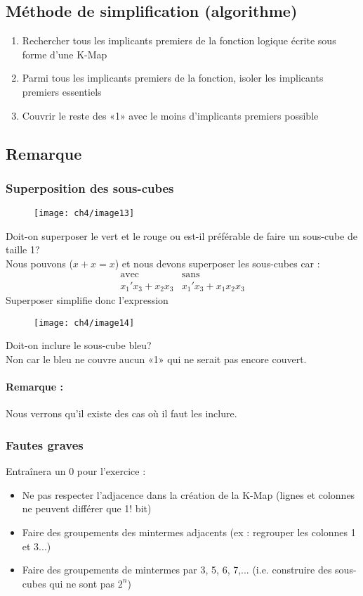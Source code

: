 \subsection{Méthode de simplification (algorithme)}
\begin{enumerate}
	\item Rechercher tous les implicants premiers de la fonction logique écrite sous forme d'une K-Map
	\item Parmi tous les implicants premiers de la fonction, isoler les implicants premiers essentiels 
	\item Couvrir le reste des «1» avec le moins d'implicants premiers possible
\end{enumerate}
\subsection{Remarque}
\subsubsection{Superposition des sous-cubes}
\begin{figure}[H]
	\centering
	\texttt{[image: ch4/image13]}
\end{figure}
Doit-on superposer le vert et le rouge ou est-il préférable de faire un sous-cube de taille 1?\\
Nous pouvons ($x+x=x$) et nous devons superposer les sous-cubes car :
\begin{equation}
	\begin{array}{cc}
		\text{avec} & \text{sans} \\
		x_1'x_3+x_2x_3 & x_1'x_3+x_1x_2x_3
	\end{array}
\end{equation}
Superposer simplifie donc l'expression
\begin{figure}[H]
	\centering
	\texttt{[image: ch4/image14]}
\end{figure}
Doit-on inclure le sous-cube bleu?\\
Non car le bleu ne couvre aucun «1» qui ne serait pas encore couvert.
\paragraph{Remarque :} Nous verrons qu'il existe des cas où il faut les inclure.
\subsubsection{Fautes graves}
Entraînera un 0 pour l'exercice :
\begin{itemize}
	\item Ne pas respecter l'adjacence dans la création de la K-Map (lignes et colonnes ne peuvent différer que 1! bit)
	\item Faire des groupements des mintermes adjacents (ex : regrouper les colonnes 1 et 3...)
	\item Faire des groupements de mintermes par 3, 5, 6, 7,... (i.e. construire des sous-cubes qui ne sont pas $2^n$)
\end{itemize}
